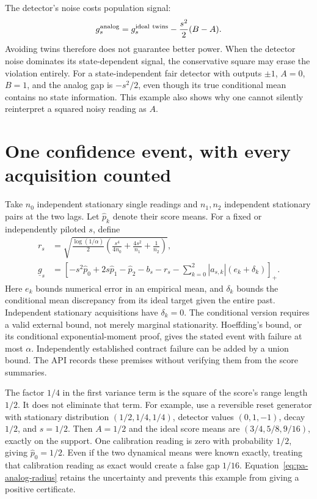 The detector's noise costs population signal:
\[
 g_s^{\rm analog}=g_s^{\rm ideal\ twins}-\frac{s^2}{2}(B-A).
\]
Avoiding twins therefore does not guarantee better power. When the detector
noise dominates its state-dependent signal, the conservative square may erase
the violation entirely. For a state-independent fair detector with outputs
$\pm1$, $A=0$, $B=1$, and the analog gap is $-s^2/2$, even though its true
conditional mean contains no state information. This example also shows why
one cannot silently reinterpret a squared noisy reading as $A$.

\section{One confidence event, with every acquisition counted}
Take $n_0$ independent stationary single readings and $n_1,n_2$ independent
stationary pairs at the two lags. Let $\widehat p_k$ denote their score means.
For a fixed or independently piloted $s$, define
\begin{align}
 r_s&=\sqrt{\frac{\log(1/\alpha)}2
       \left(\frac{s^4}{4n_0}+\frac{4s^2}{n_1}+\frac1{n_2}\right)},
       \label{eq:pa-analog-radius}\\
 \underline g_s&=\left[
   -s^2\widehat p_0+2s\widehat p_1-\widehat p_2-b_s-r_s
   -\sum_{k=0}^2|a_{s,k}|(e_k+\delta_k)
 \right]_+.
 \label{eq:pa-analog-gap}
\end{align}
Here $e_k$ bounds numerical error in an empirical mean, and $\delta_k$ bounds
the conditional mean discrepancy from its ideal target given the entire past.
Independent stationary acquisitions have $\delta_k=0$. The conditional version
requires a valid external bound, not merely marginal stationarity. Hoeffding's
bound, or its conditional exponential-moment proof, gives the stated event
with failure at most $\alpha$. Independently established contract failure can
be added by a union bound. The API records these premises without verifying
them from the score summaries.

The factor $1/4$ in the first variance term is the square of the score's range
length $1/2$. It does not eliminate that term. For example, use a reversible
reset generator with stationary distribution $(1/2,1/4,1/4)$, detector values
$(0,1,-1)$, decay $1/2$, and $s=1/2$. Then $A=1/2$ and the ideal score means
are $(3/4,5/8,9/16)$, exactly on the support. One calibration reading is zero
with probability $1/2$, giving $\widehat p_0=1/2$. Even if the two dynamical
means were known exactly, treating that calibration reading as exact would
create a false gap $1/16$. Equation~\eqref{eq:pa-analog-radius} retains the
uncertainty and prevents this example from giving a positive certificate.

